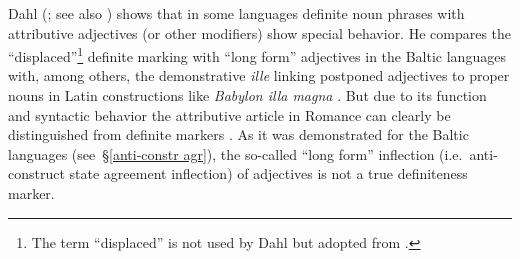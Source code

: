 {Dahl (\citeyear[149–152]{dahl2003}; see also \citealt[115]{dahl2007}) shows that in some languages definite noun phrases with attributive adjectives (or other modifiers) show special behavior. He compares the “displaced”\footnote{The term “displaced” is not used by Dahl but adopted from \citet[114–116]{melcuk2006}.} definite marking with “long form” adjectives in the Baltic languages with, among others, the demonstrative \textit{ille} linking postponed adjectives to proper nouns in Latin constructions like \textit{Babylon illa magna} \cite[150]{dahl2003}. But due to its function and syntactic behavior the attributive article in Romance can clearly be distinguished from definite markers \citep[329]{gamillscheg1937}. As it was demonstrated for the Baltic languages (see~\S\ref{anti-constr agr}), the so-called “long form” inflection (i.e.~anti-construct state agreement inflection) of adjectives is not a true definiteness marker.

}
